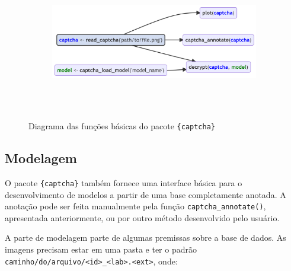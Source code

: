 \documentclass[12pt,twoside,brazilian]{book}
\begin{document}
\begin{figure}

{\centering 

\begin{figure}[H]

{\centering \includegraphics[width=6.61in,height=2.38in]{./resultados_files/figure-latex/mermaid-figure-1.png}

}

\end{figure}

}

\caption{\label{fig-diagrama-captcha-simples}Diagrama das funções
básicas do pacote \texttt{\{captcha\}}}

\end{figure}

\hypertarget{sec-ap-modelagem}{%
\subsection{Modelagem}\label{sec-ap-modelagem}}

O pacote \texttt{\{captcha\}} também fornece uma interface básica para o
desenvolvimento de modelos a partir de uma base completamente anotada. A
anotação pode ser feita manualmente pela função
\texttt{captcha\_annotate()}, apresentada anteriormente, ou por outro
método desenvolvido pelo usuário.

A parte de modelagem parte de algumas premissas sobre a base de dados.
As imagens precisam estar em uma pasta e ter o padrão
\texttt{caminho/do/arquivo/\textless{}id\textgreater{}\_\textless{}lab\textgreater{}.\textless{}ext\textgreater{}},
onde:
\end{document}
